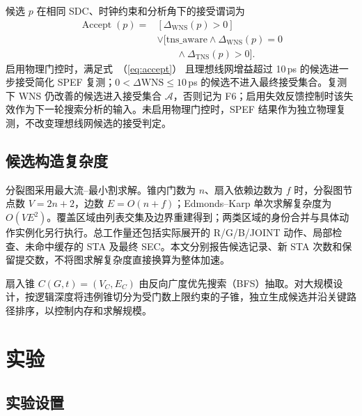 \documentclass[twocolumn,10pt,fontset=windows]{ctexart}
\renewcommand{\eqref}[1]{\textup{（\ref{#1}）}}
\begin{document}
候选 $p$ 在相同 SDC、时钟约束和分析角下的接受谓词为
\begin{equation}
\label{eq:accept}
\begin{aligned}
\operatorname{Accept}(p)={}&[\Delta_{\mathrm{WNS}}(p)>0]\\
&\lor[\mathrm{tns\_aware}\land\Delta_{\mathrm{WNS}}(p)=0\\
&\qquad\land\Delta_{\mathrm{TNS}}(p)>0].
\end{aligned}
\end{equation}
启用物理门控时，满足式~\eqref{eq:accept} 且理想线网增益超过 10\,ps 的候选进一步接受简化 SPEF 复测；$0<\Delta\mathrm{WNS}\le10\,$ps 的候选不进入最终接受集合。复测下 WNS 仍改善的候选进入接受集合 $\mathcal{A}$，否则记为 F6；启用失效反馈控制时该失效作为下一轮搜索分析的输入。未启用物理门控时，SPEF 结果作为独立物理复测，不改变理想线网候选的接受判定。

\subsection{候选构造复杂度}\label{sec:impl}

分裂图采用最大流--最小割求解。锥内门数为 $n$、扇入依赖边数为 $f$ 时，分裂图节点数 $V=2n+2$，边数 $E=O(n+f)$；Edmonds--Karp 单次求解复杂度为 $O(VE^2)$。覆盖区域由列表交集及边界重建得到；两类区域的身份合并与具体动作实例化另行执行。总工作量还包括实际展开的 R/G/B/JOINT 动作、局部检查、未命中缓存的 STA 及最终 SEC。本文分别报告候选记录、新 STA 次数和保留提交数，不将图求解复杂度直接换算为整体加速。

扇入锥 $C(G, t) = (V_C, E_C)$ 由反向广度优先搜索（BFS）抽取。对大规模设计，按逻辑深度将违例锥切分为受门数上限约束的子锥，独立生成候选并沿关键路径排序，以控制内存和求解规模。

\section{实验}\label{sec:exp}

\subsection{实验设置}\label{sec:setup}
\end{document}
